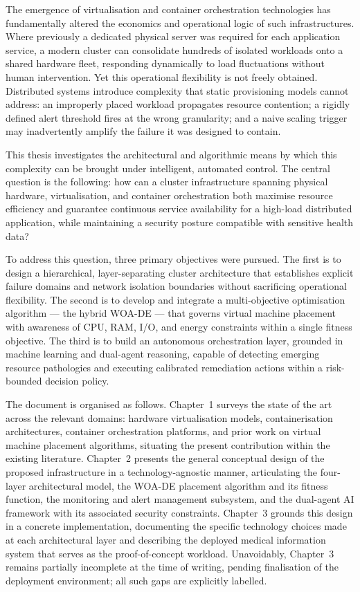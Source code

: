 \documentclass[12pt,a4paper]{report}
\begin{document}
The emergence of virtualisation and container orchestration technologies has
fundamentally altered the economics and operational logic of such infrastructures.
Where previously a dedicated physical server was required for each application
service, a modern cluster can consolidate hundreds of isolated workloads onto a
shared hardware fleet, responding dynamically to load fluctuations without human
intervention. Yet this operational flexibility is not freely obtained. Distributed
systems introduce complexity that static provisioning models cannot address: an
improperly placed workload propagates resource contention; a rigidly defined alert
threshold fires at the wrong granularity; and a naive scaling trigger may inadvertently
amplify the failure it was designed to contain.

This thesis investigates the architectural and algorithmic means by which this
complexity can be brought under intelligent, automated control. The central question
is the following: how can a cluster infrastructure spanning physical hardware,
virtualisation, and container orchestration both maximise resource
efficiency and guarantee continuous service availability for a high-load distributed
application, while maintaining a security posture compatible with sensitive health
data?

To address this question, three primary objectives were pursued. The first is to
design a hierarchical, layer-separating cluster architecture that establishes explicit
failure domains and network isolation boundaries without sacrificing operational
flexibility. The second is to develop and integrate a multi-objective optimisation
algorithm --- the hybrid WOA-DE --- that governs virtual machine placement with
awareness of CPU, RAM, I/O, and energy constraints within a single fitness objective. The third is to
build an autonomous orchestration layer, grounded in machine learning and dual-agent
reasoning, capable of detecting emerging resource pathologies and executing calibrated
remediation actions within a risk-bounded decision policy.

The document is organised as follows. Chapter~1 surveys the state of the art across
the relevant domains: hardware virtualisation models, containerisation architectures,
container orchestration platforms, and prior work on virtual machine placement
algorithms, situating the present contribution within the existing literature.
Chapter~2 presents the general conceptual design of the proposed infrastructure in a
technology-agnostic manner, articulating the four-layer architectural model, the
WOA-DE placement algorithm and its fitness function, the monitoring and alert
management subsystem, and the dual-agent AI framework with its associated security
constraints. Chapter~3 grounds this design in a concrete implementation, documenting
the specific technology choices made at each architectural layer and describing the
deployed medical information system that serves as the proof-of-concept workload.
Unavoidably, Chapter~3 remains partially incomplete at the time of writing, pending
finalisation of the deployment environment; all such gaps are explicitly labelled.
\end{document}
